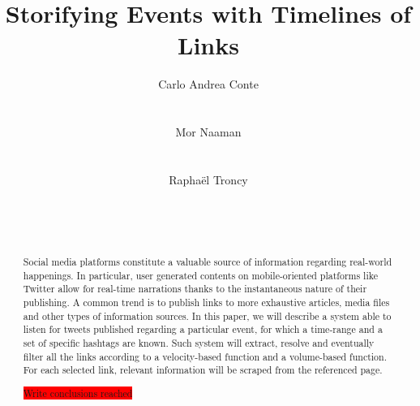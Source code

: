 \documentclass{sig-alternate}
\newcommand{\todo}[1]{\colorbox{red}{#1}}
\begin{document}
\title{Storifying Events with Timelines of Links}

\author{
\alignauthor Carlo Andrea Conte\\
	\\
    \\
\alignauthor Mor Naaman\\
    \\
    \\
\alignauthor Rapha\"el Troncy\\
	\\
	\\
		\\
}

\maketitle


\begin{abstract}

Social media platforms constitute a valuable source of information regarding real-world happenings. In particular, user generated contents on mobile-oriented platforms like Twitter allow for real-time narrations thanks to the instantaneous nature of their publishing. A common trend is to publish links to more exhaustive articles, media files and other types of information sources. In this paper, we will describe a system able to listen for tweets published regarding a particular event, for which a time-range and a set of specific hashtags are known. Such system will extract, resolve and eventually filter all the links according to a velocity-based function and a volume-based function. For each selected link, relevant information will be scraped from the referenced page.

\todo{Write conclusions reached}

\end{abstract}

\end{document}
